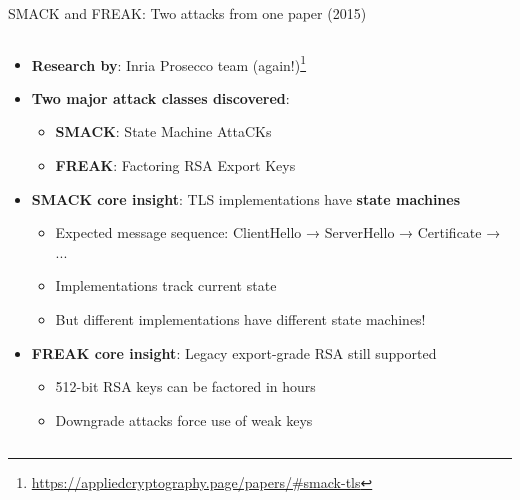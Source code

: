 \documentclass[aspectratio=169, lualatex, handout]{beamer}
\begin{document}
\begin{frame}{SMACK and FREAK: Two attacks from one paper (2015)}
	\begin{columns}[c]
		\begin{column}{1\textwidth}
			\begin{itemize}[<+->]
				\item \textbf{Research by}: Inria Prosecco team (again!)\footnote{\url{https://appliedcryptography.page/papers/\#smack-tls}}
				\item \textbf{Two major attack classes discovered}:
				      \begin{itemize}
					      \item \textbf{SMACK}: State Machine AttaCKs
					      \item \textbf{FREAK}: Factoring RSA Export Keys
				      \end{itemize}
				\item \textbf{SMACK core insight}: TLS implementations have \textbf{state machines}
				      \begin{itemize}
					      \item Expected message sequence: ClientHello → ServerHello → Certificate → ...
					      \item Implementations track current state
					      \item But different implementations have different state machines!
				      \end{itemize}
				\item \textbf{FREAK core insight}: Legacy export-grade RSA still supported
				      \begin{itemize}
					      \item 512-bit RSA keys can be factored in hours
					      \item Downgrade attacks force use of weak keys
				      \end{itemize}
			\end{itemize}
		\end{column}
	\end{columns}
\end{frame}
\end{document}
